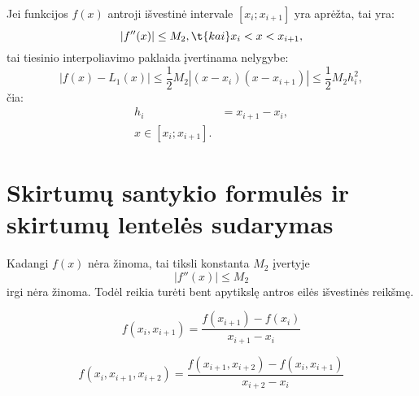 \begin{prop}
  Jei funkcijos $f(x)$ antroji išvestinė intervale
  $\left[ x_{i}; x_{i+1} \right]$ yra aprėžta, tai yra:
  \begin{equation*}
    |f''(x)| \leq M_{2}, \t{ kai } x_{i} < x < x_{i+1},
  \end{equation*}
  tai tiesinio interpoliavimo paklaida įvertinama nelygybe:
  \begin{equation*}
    |f(x) - L_{1}(x)| \leq \frac{1}{2}M_{2}|(x-x_{i})(x-x_{i+1})|
    \leq \frac{1}{2}M_{2}h_{i}^{2},
  \end{equation*}
  čia:
  \begin{align*}
    h_{i} &= x_{i+1} - x_{i}, \\
    x \in \left[ x_{i}; x_{i+1} \right].
  \end{align*}
\end{prop}



\section{Skirtumų santykio formulės ir skirtumų lentelės sudarymas}

\cite[163]{textbook}


Kadangi $f(x)$ nėra žinoma, tai tiksli konstanta $M_{2}$ įvertyje
\begin{equation*}
  |f''(x)| \leq M_{2}
\end{equation*}
irgi nėra žinoma. Todėl reikia turėti bent apytikslę antros eilės išvestinės
reikšmę.


\begin{defn}
  \begin{equation*}
    f(x_{i}, x_{i+1}) = \frac{f(x_{i+1}) - f(x_{i})}{x_{i+1} - x_{i}}
  \end{equation*}
\end{defn}

\begin{defn}
  \begin{equation*}
    f(x_{i},x_{i+1},x_{i+2})
      = \frac{f(x_{i+1},x_{i+2})-f(x_{i},x_{i+1})}{x_{i+2}-x_{i}}
  \end{equation*}
\end{defn}

